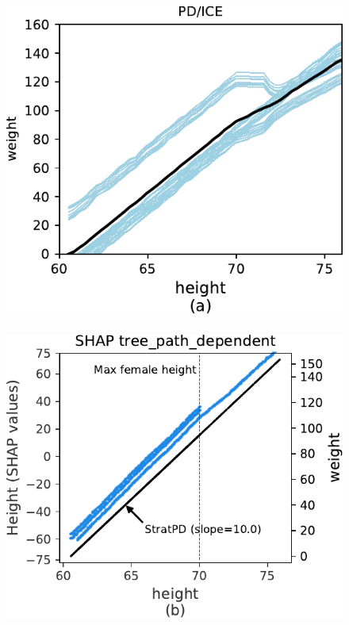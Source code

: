 \documentclass{article}
\begin{document}
\begin{figure}[htbp]
\begin{center}
\includegraphics[scale=0.35]{images/height_vs_weight_pdp.pdf}~~
\includegraphics[scale=0.35]{images/weight_tree_path_dependent_shap.pdf}~~

\end{center}
\end{figure}
\end{document}
